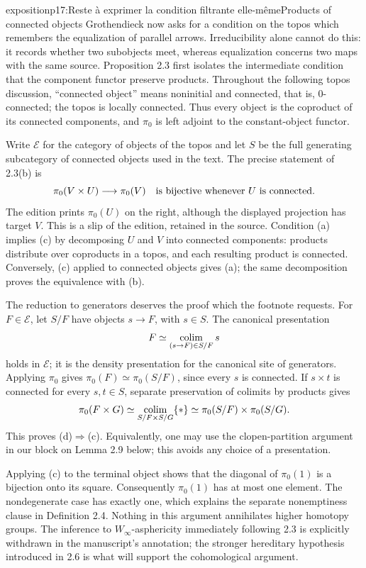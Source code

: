 \begin{dcomment}{exposition}{p17:Reste à exprimer la condition filtrante elle-même}{Products of connected objects}
Grothendieck now asks for a condition on the topos which remembers the equalization of parallel arrows. Irreducibility alone cannot do this: it records whether two subobjects meet, whereas equalization concerns two maps with the same source. Proposition 2.3 first isolates the intermediate condition that the component functor preserve products. Throughout the following topos discussion, ``connected object'' means noninitial and connected, that is, $0$-connected; the topos is locally connected. Thus every object is the coproduct of its connected components, and $\pi _0$ is left adjoint to the constant-object functor.

Write $\mathcal E$ for the category of objects of the topos and let $S$ be the full generating subcategory of connected objects used in the text. The precise statement of 2.3(b) is
\[
 \pi _0(V\times U)\longrightarrow\pi _0(V)
 \quad\hbox{is bijective whenever $U$ is connected.}
\]
The edition prints $\pi _0(U)$ on the right, although the displayed projection has target $V$. This is a slip of the edition, retained in the source. Condition (a) implies (c) by decomposing $U$ and $V$ into connected components: products distribute over coproducts in a topos, and each resulting product is connected. Conversely, (c) applied to connected objects gives (a); the same decomposition proves the equivalence with (b).

The reduction to generators deserves the proof which the footnote requests. For $F\in\mathcal E$, let $S/F$ have objects $s\to F$, with $s\in S$. The canonical presentation
\[
 F\simeq\mathop{\rm colim}_{(s\to F)\in S/F}s
\]
holds in $\mathcal E$; it is the density presentation for the canonical site of generators. Applying $\pi _0$ gives $\pi _0(F)\simeq\pi _0(S/F)$, since every $s$ is connected. If $s\times t$ is connected for every $s,t\in S$, separate preservation of colimits by products gives
\[
 \pi _0(F\times G)
 \simeq\mathop{\rm colim}_{S/F\times S/G}\{*\}
 \simeq\pi _0(S/F)\times\pi _0(S/G).
\]
This proves (d)$\Rightarrow$(c). Equivalently, one may use the clopen-partition argument in our block on Lemma 2.9 below; this avoids any choice of a presentation.

Applying (c) to the terminal object shows that the diagonal of $\pi _0(1)$ is a bijection onto its square. Consequently $\pi _0(1)$ has at most one element. The nondegenerate case has exactly one, which explains the separate nonemptiness clause in Definition 2.4. Nothing in this argument annihilates higher homotopy groups. The inference to $W_\infty$-asphericity immediately following 2.3 is explicitly withdrawn in the manuscript's annotation; the stronger hereditary hypothesis introduced in 2.6 is what will support the cohomological argument.
\end{dcomment}

